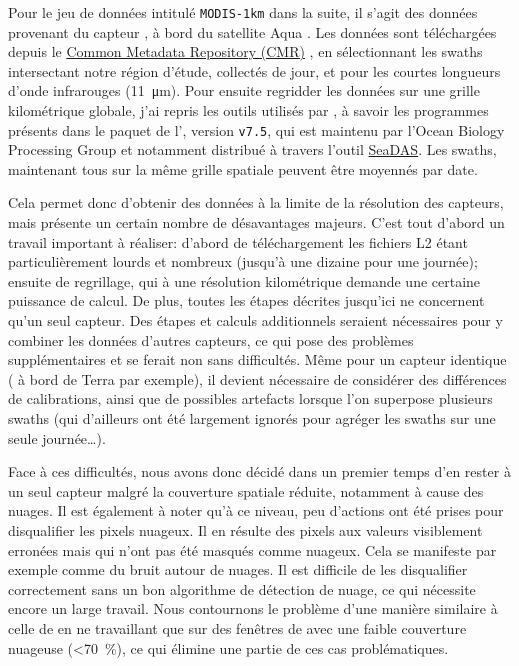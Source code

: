 \documentclass[index]{subfiles}
\begin{document}
Pour le jeu de données intitulé \verb|MODIS-1km| dans la suite, il s'agit des données provenant du capteur , à bord du satellite Aqua \textcite{kilpatrick_2015}.
Les données sont téléchargées depuis le \href{https://cmr.earthdata.nasa.gov/search/}{Common Metadata Repository (CMR)} \parencite{sst_modis}, en sélectionnant les swaths intersectant notre région d'étude, collectés de jour, et pour les courtes longueurs d'onde infrarouges (\qty{11}{\um}).
Pour ensuite regridder les données sur une grille kilométrique globale, j'ai repris les outils utilisés par \textcite{liu_2016}, à savoir les programmes présents dans le paquet de l'\href{https://oceandata.sci.gsfc.nasa.gov/ocssw}{}, version \verb|v7.5|, qui est maintenu par l'Ocean Biology Processing Group et notamment distribué à travers l'outil \href{https://seadas.gsfc.nasa.gov/}{SeaDAS}.
Les swaths, maintenant tous sur la même grille spatiale peuvent être moyennés par date.

Cela permet donc d'obtenir des données à la limite de la résolution des capteurs, mais présente un certain nombre de désavantages majeurs.
C'est tout d'abord un travail important à réaliser: d'abord de téléchargement les fichiers L2 étant particulièrement lourds et nombreux (jusqu'à une dizaine pour une journée); ensuite de regrillage, qui à une résolution kilométrique demande une certaine puissance de calcul.
De plus, toutes les étapes décrites jusqu'ici ne concernent qu'un seul capteur.
Des étapes et calculs additionnels seraient nécessaires pour y combiner les données d'autres capteurs, ce qui pose des problèmes supplémentaires et se ferait non sans difficultés.
Même pour un capteur identique ( à bord de Terra par exemple), il devient nécessaire de considérer des différences de calibrations, ainsi que de possibles artefacts lorsque l'on superpose plusieurs swaths (qui d'ailleurs ont été largement ignorés pour agréger les swaths sur une seule journée\dots).

Face à ces difficultés, nous avons donc décidé dans un premier temps d'en rester à un seul capteur malgré la couverture spatiale réduite, notamment à cause des nuages.
Il est également à noter qu'à ce niveau, peu d'actions ont été prises pour disqualifier les pixels nuageux.
Il en résulte des pixels aux valeurs visiblement erronées mais qui n'ont pas été masqués comme nuageux.
Cela se manifeste par exemple comme du bruit autour de nuages.
Il est difficile de les disqualifier correctement sans un bon algorithme de détection de nuage, ce qui nécessite encore un large travail.
Nous contournons le problème d'une manière similaire à celle de \textcite{liu_2016} en ne travaillant que sur des fenêtres de  avec une faible couverture nuageuse (\textless\qty{70}{\percent}), ce qui élimine une partie de ces cas problématiques.
\end{document}
